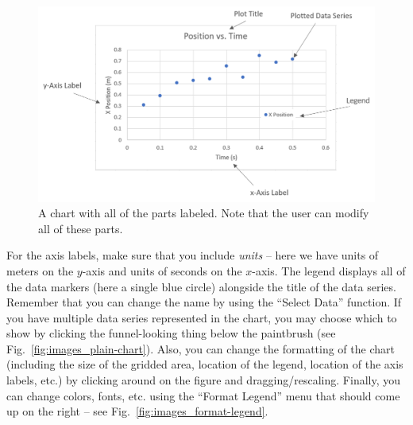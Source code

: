 \documentclass[10pt]{article}
\begin{document}
\begin{figure}[htpb]
	\centering
	\includegraphics[width=0.8\linewidth]{images/full-chart-labeled.png}
	\caption{A chart with all of the parts labeled. Note that the user can modify all of these parts.}%
	\label{fig:images_full-chart-labeled}
\end{figure}


For the axis labels, make sure that you include \textit{units} -- here we have units of meters on the $y$-axis and units of seconds on the $x$-axis. The legend displays all of the data markers (here a single blue circle) alongside the title of the data series. Remember that you can change the name by using the ``Select Data'' function. If you have multiple data series represented in the chart, you may choose which to show by clicking the funnel-looking thing below the paintbrush (see Fig.~\ref{fig:images_plain-chart}). Also, you can change the formatting of the chart (including the size of the gridded area, location of the legend, location of the axis labels, etc.) by clicking around on the figure and dragging/rescaling. Finally, you can change colors, fonts, etc. using the ``Format Legend'' menu that should come up on the right -- see Fig.~\ref{fig:images_format-legend}.
\end{document}
